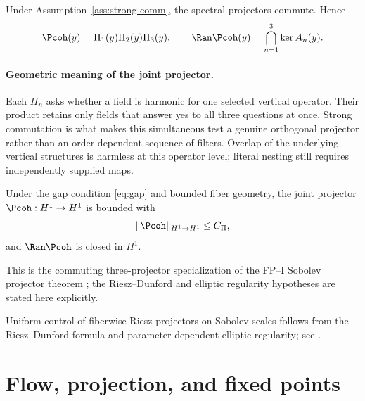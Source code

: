 \documentclass[11pt]{article}
\begin{document}
\begin{lemma}\label{lem:comm-range}
Under Assumption~\ref{ass:strong-comm}, the spectral projectors commute. Hence
\[
\Pcoh(y)=\Pi_1(y)\Pi_2(y)\Pi_3(y),
\qquad
\Ran \Pcoh(y)=\bigcap_{n=1}^{3}\ker A_n(y).
\]
\end{lemma}

\paragraph{Geometric meaning of the joint projector.}
Each $\Pi_n$ asks whether a field is harmonic for one selected vertical
operator.  Their product retains only fields that answer yes to all three
questions at once.  Strong commutation is what makes this simultaneous test a
genuine orthogonal projector rather than an order-dependent sequence of
filters.  Overlap of the underlying vertical structures is harmless at this
operator level; literal nesting still requires independently supplied maps.

\begin{corollary}\label{lem:Pcoh-H1}
Under the gap condition \eqref{eq:gap} and bounded fiber geometry, the joint projector
$\Pcoh:H^{1}\to H^{1}$ is bounded with
\[
\|\Pcoh\|_{H^{1}\to H^{1}}\le C_{\Pi},
\]
and $\Ran \Pcoh$ is closed in $H^{1}$.
\end{corollary}

This is the commuting three-projector specialization of the FP--I Sobolev
projector theorem \cite{Nero2025FP1}; the Riesz--Dunford and elliptic
regularity hypotheses are stated here explicitly.

\begin{remark}
Uniform control of fiberwise Riesz projectors on Sobolev scales follows from the Riesz--Dunford formula
and parameter-dependent elliptic regularity; see \cite{Kato1976,Hebey2000}.
\end{remark}

\section{Flow, projection, and fixed points}
\end{document}
